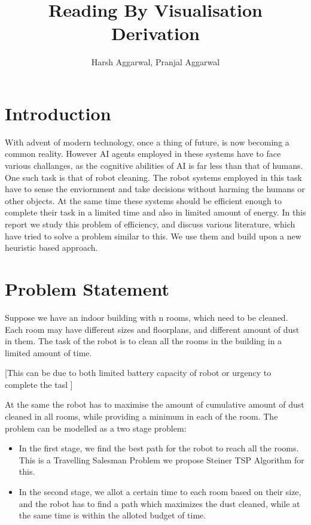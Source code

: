 \documentclass{article}
\title{Reading By Visualisation Derivation}
\author{Harsh Aggarwal, Pranjal Aggarwal}
\date{}
\begin{document}
\maketitle

\section{Introduction}

With advent of modern technology, once a thing of future, is now becoming a common reality. However AI agents employed
in these systems have to face various challanges, as the cognitive abilities of AI is far less than that of humans. 
One such task is that of robot cleaning. The robot systems employed in this task have to sense the enviornment
and take decisions without harming the humans or other objects. At the same time these systems should be efficient enough to complete their task in
a limited time and also in limited amount of energy. In this report we study this problem of efficiency, and discuss various literature, which have tried to solve a problem similar to this.
We use them and build upon a new heuristic based approach.

\section{Problem Statement}

Suppose we have an indoor building with n rooms, which need to be cleaned. Each room may have different sizes
and floorplans, and different amount of dust in them. The task of the robot is to clean all the rooms in the building in a limited amount of time.

[This can be due to both limited battery capacity of robot or urgency to complete the tasl ]

At the same the robot has to maximise the amount of cumulative amount of dust cleaned in all rooms, while providing a minimum in each of the room.
The problem can be modelled as a two stage problem:
\begin{itemize}
    \item In the first stage, we find the best path for the robot to reach all the rooms. This is a Travelling Salesman Problem we propose Steiner TSP Algorithm for this.
    \item In the second stage, we allot a certain time to each room based on their size, and the robot has to find a path which maximizes the dust cleaned, while at the same time is within the alloted budget of time.
\end{itemize}
\end{document}

